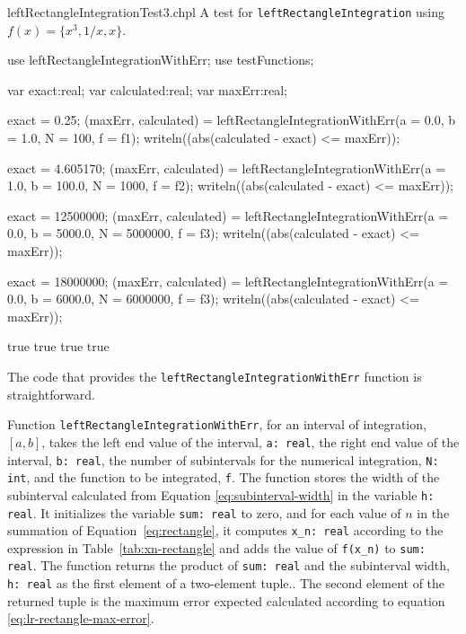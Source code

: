 \begin{chapelexample}{leftRectangleIntegrationTest3.chpl}
  A test for \lstinline{leftRectangleIntegration} using $f(x) = \{x^3, 1/x, x\}$.
  \begin{chapelpre}
  \end{chapelpre}
  \begin{chapel}
    use leftRectangleIntegrationWithErr;
    use testFunctions;

    var exact:real;
    var calculated:real;
    var maxErr:real;

    exact = 0.25;
    (maxErr, calculated) = leftRectangleIntegrationWithErr(a = 0.0, b = 1.0, N = 100, f = f1);
    writeln((abs(calculated - exact) <= maxErr));

    exact = 4.605170;
    (maxErr, calculated) = leftRectangleIntegrationWithErr(a = 1.0, b = 100.0, N = 1000, f = f2);
    writeln((abs(calculated - exact) <= maxErr));

    exact = 12500000;
    (maxErr, calculated) = leftRectangleIntegrationWithErr(a = 0.0, b = 5000.0, N = 5000000, f = f3);
    writeln((abs(calculated - exact) <= maxErr));

    exact = 18000000;
    (maxErr, calculated) = leftRectangleIntegrationWithErr(a = 0.0, b = 6000.0, N = 6000000, f = f3);
    writeln((abs(calculated - exact) <= maxErr));
  \end{chapel}
  \begin{chapelpost}
  \end{chapelpost}
  \begin{chapeloutput}
true
true
true
true
  \end{chapeloutput}
\end{chapelexample}

The code that provides the \lstinline{leftRectangleIntegrationWithErr} function is straightforward.
\begin{enumspec}
\item{} Function \lstinline{leftRectangleIntegrationWithErr}, for an interval
  of integration, $[a,b]$,
  takes the left end value of the interval, \lstinline{a: real}, the right end value
  of the interval, \lstinline{b: real}, the number of subintervals for the numerical
  integration, \lstinline{N: int}, and the function to be integrated, \lstinline{f}.
  The function stores the width of the subinterval calculated from Equation 
  \ref{eq:subinterval-width} in the variable \lstinline{h: real}. It initializes the variable
  \lstinline{sum: real} to zero, and for each value of $n$ in the summation of Equation~\ref{eq:rectangle},
  it computes \lstinline{x_n: real} according to the expression in Table~\ref{tab:xn-rectangle} and adds
  the value of \lstinline{f(x_n)} to \lstinline{sum: real}. The function returns the product of 
  \lstinline{sum: real} and the subinterval width, \lstinline{h: real} as the first element of a two-element
  tuple..
  The second element of the returned tuple is the
  maximum error expected calculated according to equation \ref{eq:lr-rectangle-max-error}.
\end{enumspec}


